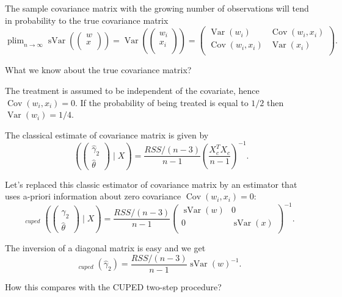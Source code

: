 \documentclass[10pt, a4paper]{article}
\DeclareMathOperator*\plim{plim}
\DeclareMathOperator{\Var}{Var}
\DeclareMathOperator{\sVar}{sVar}
\DeclareMathOperator{\hVar}{\widehat{\Var}}
\DeclareMathOperator{\Cov}{Cov}
\begin{document}
The sample covariance matrix with the growing number of observations will tend in probability to the true 
covariance matrix 
\[
\plim_{n\to\infty} \sVar\left(
    \begin{pmatrix}    
        w \\
        x \\
    \end{pmatrix}
\right) = 
\Var\left(
    \begin{pmatrix}    
        w_i \\
        x_i \\
    \end{pmatrix}
\right) =     \begin{pmatrix}    
    \Var(w_i) & \Cov(w_i, x_i) \\
    \Cov(w_i, x_i) & \Var(x_i) \\
\end{pmatrix}.
\]

What we know about the true covariance matrix?

The treatment is assumed to be independent of the covariate, hence $\Cov(w_i, x_i) = 0$.
If the probability of being treated is equal to $1/2$ then $\Var(w_i) = 1/4$.

The classical estimate of covariance matrix is given by 
\[
\hVar\left( 
    \begin{pmatrix}    
        \hat \gamma_2 \\
        \hat \theta
    \end{pmatrix}
    \mid X \right) = 
\frac{RSS/(n-3)}{n-1} \left(\frac{X_c^TX_c}{n-1}\right)^{-1}.
\]

Let's replaced this classic estimator of covariance matrix by an estimator that uses a-priori information 
about zero covariance $\Cov(w_i, x_i) = 0$:
\[
\hVar_{cuped}\left( 
    \begin{pmatrix}    
        \hat \gamma_2 \\
        \hat \theta
    \end{pmatrix}
    \mid X \right) = 
\frac{RSS/(n-3)}{n-1} 
\begin{pmatrix}
\sVar(w) & 0 \\
0 & \sVar(x) \\
\end{pmatrix}
^{-1}.
\]

The inversion of a diagonal matrix is easy and we get
\[
\hVar_{cuped}(\hat\gamma_2) = \frac{RSS/(n-3)}{n-1} \sVar(w)^{-1}.    
\]


How this compares with the CUPED two-step procedure?
\end{document}
